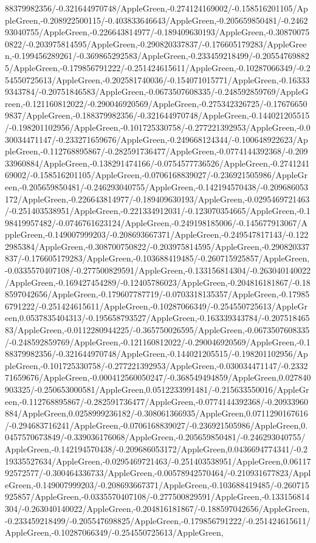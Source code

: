 {\begin{tikzternal}
{88379982356/-0.321644970748/AppleGreen,-0.274124169002/-0.158516201105/AppleGreen,-0.208922500115/-0.403833646643/AppleGreen,-0.205659850481/-0.246293040755/AppleGreen,-0.226643814977/-0.189409630193/AppleGreen,-0.308700750822/-0.203975814595/AppleGreen,-0.290820337837/-0.176605179283/AppleGreen,-0.199456289261/-0.369865292583/AppleGreen,-0.233459218499/-0.205547698825/AppleGreen,-0.179856791222/-0.251424615611/AppleGreen,-0.10287066349/-0.254550725613/AppleGreen,-0.202581740036/-0.154071015771/AppleGreen,-0.163339343784/-0.20751846583/AppleGreen,-0.0673507608335/-0.248592859769/AppleGreen,-0.121160812022/-0.290046920569/AppleGreen,-0.275342326725/-0.176766509837/AppleGreen,-0.188379982356/-0.321644970748/AppleGreen,-0.144021205515/-0.198201102956/AppleGreen,-0.101725330758/-0.277221392953/AppleGreen,-0.030034471147/-0.233271659676/AppleGreen,-0.249668124344/-0.100648922623/AppleGreen,-0.112768895867/-0.282591736477/AppleGreen,-0.0774144392368/-0.20933960884/AppleGreen,-0.138291474166/-0.0754577736526/AppleGreen,-0.274124169002/-0.158516201105/AppleGreen,-0.0706168839027/-0.236921505986/AppleGreen,-0.205659850481/-0.246293040755/AppleGreen,-0.142194570438/-0.209686053172/AppleGreen,-0.226643814977/-0.189409630193/AppleGreen,-0.0295469721463/-0.251403538951/AppleGreen,-0.221334912031/-0.123070354665/AppleGreen,-0.198419957482/-0.0746761623124/AppleGreen,-0.249198185006/-0.145677913067/AppleGreen,-0.149007999203/-0.208693667371/AppleGreen,-0.249547817143/-0.1222985384/AppleGreen,-0.308700750822/-0.203975814595/AppleGreen,-0.290820337837/-0.176605179283/AppleGreen,-0.103688419485/-0.260715925857/AppleGreen,-0.0335570407108/-0.277500829591/AppleGreen,-0.133156814304/-0.263040140022/AppleGreen,-0.169427454289/-0.12405786023/AppleGreen,-0.204816181867/-0.188597042656/AppleGreen,-0.179607787719/-0.0703318135357/AppleGreen,-0.179856791222/-0.251424615611/AppleGreen,-0.10287066349/-0.254550725613/AppleGreen,0.0537835404313/-0.195658793527/AppleGreen,-0.163339343784/-0.20751846583/AppleGreen,-0.0112280944225/-0.365750026595/AppleGreen,-0.0673507608335/-0.248592859769/AppleGreen,-0.121160812022/-0.290046920569/AppleGreen,-0.188379982356/-0.321644970748/AppleGreen,-0.144021205515/-0.198201102956/AppleGreen,-0.101725330758/-0.277221392953/AppleGreen,-0.030034471147/-0.233271659676/AppleGreen,-0.000412560050247/-0.368549494859/AppleGreen,0.027840903325/-0.250653000581/AppleGreen,0.0512233991481/-0.215633550016/AppleGreen,-0.112768895867/-0.282591736477/AppleGreen,-0.0774144392368/-0.20933960884/AppleGreen,0.0258999236182/-0.308061366935/AppleGreen,0.0711290167616/-0.294683716241/AppleGreen,-0.0706168839027/-0.236921505986/AppleGreen,0.0457570673849/-0.339036176068/AppleGreen,-0.205659850481/-0.246293040755/AppleGreen,-0.142194570438/-0.209686053172/AppleGreen,0.0436694774341/-0.219335527634/AppleGreen,-0.0295469721463/-0.251403538951/AppleGreen,0.0611792572577/-0.300464336733/AppleGreen,-0.00578942570464/-0.210931677823/AppleGreen,-0.149007999203/-0.208693667371/AppleGreen,-0.103688419485/-0.260715925857/AppleGreen,-0.0335570407108/-0.277500829591/AppleGreen,-0.133156814304/-0.263040140022/AppleGreen,-0.204816181867/-0.188597042656/AppleGreen,-0.233459218499/-0.205547698825/AppleGreen,-0.179856791222/-0.251424615611/AppleGreen,-0.10287066349/-0.254550725613/AppleGreen,}
\end{tikzternal}}
